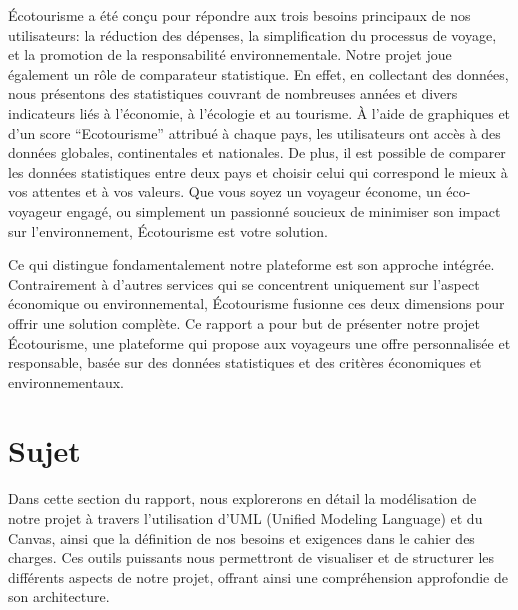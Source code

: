 \documentclass[mstat,12pt]{unswthesis}
\begin{document}
\begin{adjustwidth}{-2cm}{}
\par

Écotourisme a été conçu pour répondre aux trois besoins principaux de
nos utilisateurs: la réduction des dépenses, la simplification du
processus de voyage, et la promotion de la responsabilité
environnementale. Notre projet joue également un rôle de comparateur
statistique. En effet, en collectant des données, nous présentons des
statistiques couvrant de nombreuses années et divers indicateurs liés à
l'économie, à l'écologie et au tourisme. À l'aide de graphiques et d'un
score ``Ecotourisme'' attribué à chaque pays, les utilisateurs ont accès
à des données globales, continentales et nationales. De plus, il est
possible de comparer les données statistiques entre deux pays et choisir
celui qui correspond le mieux à vos attentes et à vos valeurs. Que vous
soyez un voyageur économe, un éco-voyageur engagé, ou simplement un
passionné soucieux de minimiser son impact sur l'environnement,
Écotourisme est votre solution.

\par

Ce qui distingue fondamentalement notre plateforme est son approche
intégrée. Contrairement à d'autres services qui se concentrent
uniquement sur l'aspect économique ou environnemental, Écotourisme
fusionne ces deux dimensions pour offrir une solution complète. Ce
rapport a pour but de présenter notre projet Écotourisme, une plateforme
qui propose aux voyageurs une offre personnalisée et responsable, basée
sur des données statistiques et des critères économiques et
environnementaux.

\hypertarget{sujet}{%
\chapter{Sujet}\label{sujet}}

Dans cette section du rapport, nous explorerons en détail la
modélisation de notre projet à travers l'utilisation d'UML (Unified
Modeling Language) et du Canvas, ainsi que la définition de nos besoins
et exigences dans le cahier des charges. Ces outils puissants nous
permettront de visualiser et de structurer les différents aspects de
notre projet, offrant ainsi une compréhension approfondie de son
architecture.


\end{adjustwidth}
\end{document}
